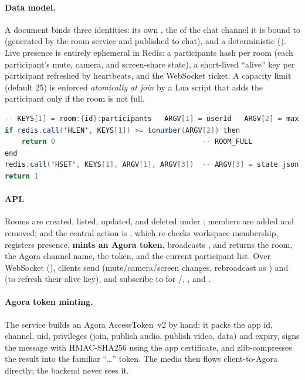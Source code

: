 \paragraph{Data model.} A  document binds three identities: its own
, the  of the chat channel it is bound to
(generated by the room service and published to chat), and a deterministic
 (). Live presence is entirely ephemeral
in Redis: a participants hash per room (each participant's mute, camera, and
screen-share state), a short-lived ``alive'' key per participant refreshed by
heartbeats, and the WebSocket ticket. A capacity limit (default 25) is enforced
\emph{atomically at join} by a Lua script that adds the participant only if the
room is not full.

\begin{lstlisting}[language=Java,caption={Representative atomic capacity check at join (Redis Lua).}]
-- KEYS[1] = room:{id}:participants   ARGV[1] = userId   ARGV[2] = max
if redis.call('HLEN', KEYS[1]) >= tonumber(ARGV[2]) then
    return 0                                   -- ROOM_FULL
end
redis.call('HSET', KEYS[1], ARGV[1], ARGV[3])  -- ARGV[3] = state json
return 1
\end{lstlisting}

\paragraph{API.} Rooms are created, listed, updated, and deleted under
; members are added and removed; and the central action is
, which re-checks workspace membership,
registers presence, \textbf{mints an Agora token}, broadcasts
, and returns the room, the Agora channel name, the
token, and the current participant list. Over WebSocket (),
clients send  (mute/camera/screen changes, rebroadcast as
) and  (to refresh their alive
key), and subscribe to  for
/, , and
.

\paragraph{Agora token minting.} The service builds an Agora AccessToken~v2
by hand: it packs the app id, channel, uid, privileges (join, publish audio,
publish video, data) and expiry, signs the message with HMAC-SHA256 using the app
certificate, and zlib-compresses the result into the familiar ``\ldots''
token. The media then flows client-to-Agora directly; the backend never sees it.

